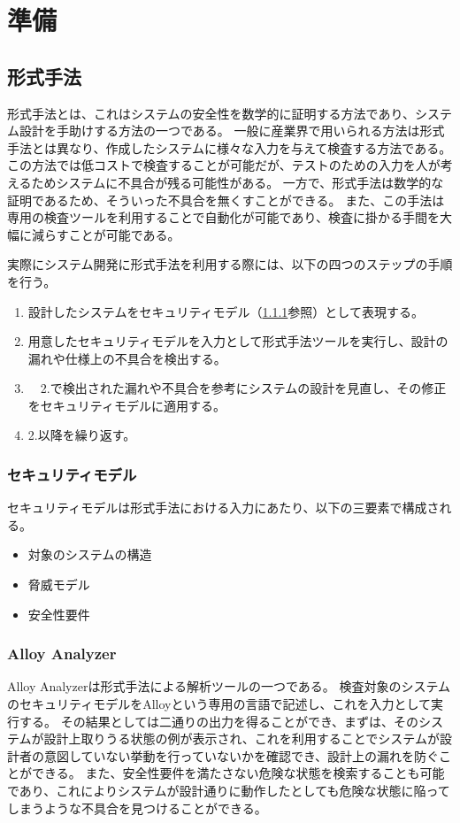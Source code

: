 \chapter{準備}
\section{形式手法}
形式手法とは、これはシステムの安全性を数学的に証明する方法であり、システム設計を手助けする方法の一つである。
一般に産業界で用いられる方法は形式手法とは異なり、作成したシステムに様々な入力を与えて検査する方法である。
この方法では低コストで検査することが可能だが、テストのための入力を人が考えるためシステムに不具合が残る可能性がある。
一方で、形式手法は数学的な証明であるため、そういった不具合を無くすことができる。
また、この手法は専用の検査ツールを利用することで自動化が可能であり、検査に掛かる手間を大幅に減らすことが可能である。

実際にシステム開発に形式手法を利用する際には、以下の四つのステップの手順を行う。
\begin{enumerate}
\item 設計したシステムをセキュリティモデル（\ref{sec:SecurityModel}参照）として表現する。
\item 用意したセキュリティモデルを入力として形式手法ツールを実行し、設計の漏れや仕様上の不具合を検出する。
\item　2.で検出された漏れや不具合を参考にシステムの設計を見直し、その修正をセキュリティモデルに適用する。
\item 2.以降を繰り返す。
\end{enumerate}

\subsection{セキュリティモデル}
\label{sec:SecurityModel}
セキュリティモデルは形式手法における入力にあたり、以下の三要素で構成される。
\begin{itemize}
\item 対象のシステムの構造
\item 脅威モデル
\item 安全性要件
\end{itemize}

\subsection{Alloy Analyzer}
Alloy Analyzerは形式手法による解析ツールの一つである。
検査対象のシステムのセキュリティモデルをAlloyという専用の言語で記述し、これを入力として実行する。
その結果としては二通りの出力を得ることができ、まずは、そのシステムが設計上取りうる状態の例が表示され、これを利用することでシステムが設計者の意図していない挙動を行っていないかを確認でき、設計上の漏れを防ぐことができる。
また、安全性要件を満たさない危険な状態を検索することも可能であり、これによりシステムが設計通りに動作したとしても危険な状態に陥ってしまうような不具合を見つけることができる。

